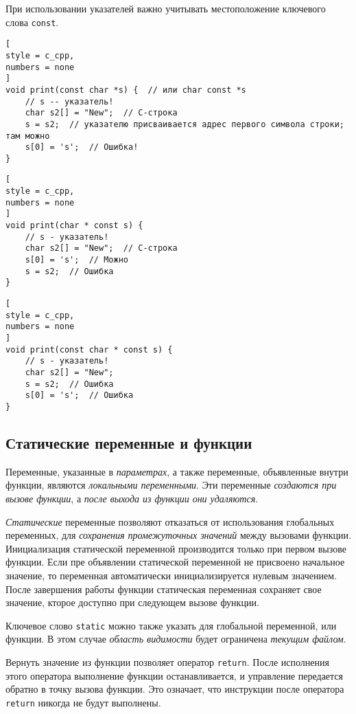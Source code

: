 \documentclass[%
	11pt,
	a4paper,
	utf8,
		]{article}
\begin{document}
При использовании указателей важно учитывать местоположение ключевого слова \verb|const|. 
\begin{lstlisting}[
style = c_cpp,
numbers = none
]
void print(const char *s) {  // или char const *s
	// s -- указатель!
    char s2[] = "New";  // C-строка
    s = s2;  // указателю присваивается адрес первого символа строки; там можно
    s[0] = 's';  // Ошибка!
}
\end{lstlisting}

\begin{lstlisting}[
style = c_cpp,
numbers = none
]
void print(char * const s) {
	// s - указатель!
    char s2[] = "New";  // C-строка
    s[0] = 's';  // Можно
    s = s2;  // Ошибка
}
\end{lstlisting}

\begin{lstlisting}[
style = c_cpp,
numbers = none
]
void print(const char * const s) {
    // s - указатель!
    char s2[] = "New";
    s = s2;  // Ошибка
    s[0] = 's';  // Ошибка
}
\end{lstlisting}

\subsection{Статические переменные и функции}

Переменные, указанные в \emph{параметрах}, а также переменные, объявленные внутри функции, являются \emph{локальными переменными}. Эти переменные \emph{создаются при вызове функции}, а \emph{после выхода из функции они удаляются}. 

\emph{Статические} переменные позволяют отказаться от использования глобальных переменных, для \emph{сохранения промежуточных значений} между вызовами функции. Инициализация статической переменной производится только при первом вызове функции. Если пре объявлении статической переменной не присвоено начальное значение, то переменная автоматически инициализируется нулевым значением. После завершения работы функции статическая переменная сохраняет свое значение, кторое доступно при следующем вызове функции.

Ключевое слово \verb|static| можно также указать для глобальной переменной, или функции. В этом случае \emph{область видимости} будет ограничена \emph{текущим файлом}.

Вернуть значение из функции позволяет оператор \verb|return|. После исполнения этого оператора выполнение функции останавливается, и управление передается обратно в точку вызова функции. Это означает, что инструкции после оператора \verb|return| никогда не будут выполнены.
\end{document}
